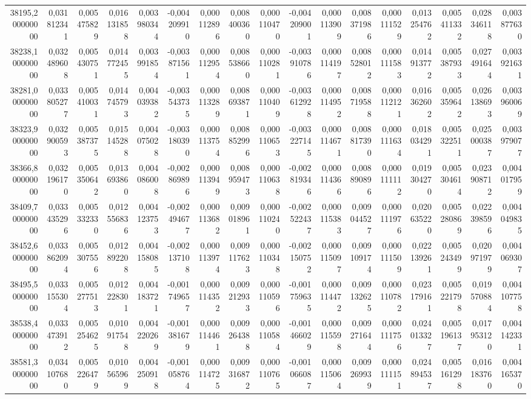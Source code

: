\begin{longtable}{rrrrrrrrrrrrrrrrr}
38195,200000000 & 0,031812341 & 0,005475829 & 0,016131858 & 0,003980344 & -0,004209910 & 0,000112896 & 0,008400360 & 0,000110470 & -0,004209001 & 0,000113909 & 0,008371986 & 0,000111529 & 0,013254762 & 0,005411332 & 0,028346118 & 0,003877630\\
38238,100000000 & 0,032489608 & 0,005430751 & 0,014772455 & 0,003991854 & -0,003871561 & 0,000112954 & 0,008538660 & 0,000110281 & -0,003910786 & 0,000114197 & 0,008528012 & 0,000111583 & 0,014913772 & 0,005387933 & 0,027491644 & 0,003921631\\
38281,000000000 & 0,033805277 & 0,005410031 & 0,014745793 & 0,004039382 & -0,003543735 & 0,000113289 & 0,008693871 & 0,000110409 & -0,003612928 & 0,000114952 & 0,008719588 & 0,000112121 & 0,016362602 & 0,005359642 & 0,026138693 & 0,003960069\\
38323,900000000 & 0,032900593 & 0,005387375 & 0,015145288 & 0,004075028 & -0,003180390 & 0,000113754 & 0,008852996 & 0,000110653 & -0,003227145 & 0,000114671 & 0,008817390 & 0,000111634 & 0,018034291 & 0,005322511 & 0,025000387 & 0,003979077\\
38366,800000000 & 0,032196170 & 0,005350642 & 0,013693860 & 0,004086008 & -0,002869896 & 0,000113949 & 0,008959473 & 0,000110638 & -0,002819346 & 0,000114366 & 0,008890896 & 0,000111112 & 0,019304270 & 0,005304614 & 0,023908712 & 0,004017959\\
38409,700000000 & 0,033435296 & 0,005332330 & 0,012556836 & 0,004123753 & -0,002494677 & 0,000113682 & 0,009018961 & 0,000110240 & -0,002522437 & 0,000115383 & 0,009044527 & 0,000111976 & 0,020635220 & 0,005280869 & 0,022398596 & 0,004049835\\
38452,600000000 & 0,033862094 & 0,005307556 & 0,012892208 & 0,004158085 & -0,002137108 & 0,000113974 & 0,009117623 & 0,000110348 & -0,002150752 & 0,000115097 & 0,009109174 & 0,000111509 & 0,022139261 & 0,005243499 & 0,020971979 & 0,004069307\\
38495,500000000 & 0,033155304 & 0,005277513 & 0,012228301 & 0,004183721 & -0,001749657 & 0,000114352 & 0,009212933 & 0,000110596 & -0,001759635 & 0,000114472 & 0,009132625 & 0,000110782 & 0,023179161 & 0,005221798 & 0,019570884 & 0,004107758\\
38538,400000000 & 0,033473912 & 0,005254625 & 0,010917548 & 0,004220269 & -0,001381679 & 0,000114461 & 0,009264388 & 0,000110584 & -0,001466029 & 0,000115598 & 0,009271644 & 0,000111756 & 0,024013327 & 0,005196137 & 0,017953120 & 0,004142331\\
38581,300000000 & 0,034107680 & 0,005226479 & 0,010565969 & 0,004250918 & -0,001058764 & 0,000114725 & 0,009316872 & 0,000110765 & -0,001066087 & 0,000115064 & 0,009269939 & 0,000111151 & 0,024894537 & 0,005161298 & 0,016183760 & 0,004165370\\

\end{longtable}
